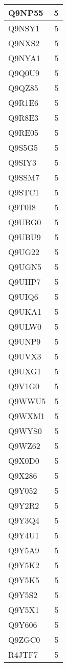 \documentclass[
]{book}
\theoremstyle{definition}
\theoremstyle{definition}
\theoremstyle{definition}
\theoremstyle{definition}
\theoremstyle{remark}
\begin{document}
\begin{table}
\begin{tabular}{l|r}
\hline
Q9NP55 & 5\\
\hline
Q9NSY1 & 5\\
\hline
Q9NXS2 & 5\\
\hline
Q9NYA1 & 5\\
\hline
Q9Q0U9 & 5\\
\hline
Q9QZ85 & 5\\
\hline
Q9R1E6 & 5\\
\hline
Q9R8E3 & 5\\
\hline
Q9RE05 & 5\\
\hline
Q9S5G5 & 5\\
\hline
Q9SIY3 & 5\\
\hline
Q9SSM7 & 5\\
\hline
Q9STC1 & 5\\
\hline
Q9T0I8 & 5\\
\hline
Q9UBG0 & 5\\
\hline
Q9UBU9 & 5\\
\hline
Q9UG22 & 5\\
\hline
Q9UGN5 & 5\\
\hline
Q9UHP7 & 5\\
\hline
Q9UIQ6 & 5\\
\hline
Q9UKA1 & 5\\
\hline
Q9ULW0 & 5\\
\hline
Q9UNP9 & 5\\
\hline
Q9UVX3 & 5\\
\hline
Q9UXG1 & 5\\
\hline
Q9V1G0 & 5\\
\hline
Q9WWU5 & 5\\
\hline
Q9WXM1 & 5\\
\hline
Q9WYS0 & 5\\
\hline
Q9WZ62 & 5\\
\hline
Q9X0D0 & 5\\
\hline
Q9X286 & 5\\
\hline
Q9Y052 & 5\\
\hline
Q9Y2R2 & 5\\
\hline
Q9Y3Q4 & 5\\
\hline
Q9Y4U1 & 5\\
\hline
Q9Y5A9 & 5\\
\hline
Q9Y5K2 & 5\\
\hline
Q9Y5K5 & 5\\
\hline
Q9Y5S2 & 5\\
\hline
Q9Y5X1 & 5\\
\hline
Q9Y606 & 5\\
\hline
Q9ZGC0 & 5\\
\hline
R4JTF7 & 5\\

\end{tabular}
\end{table}
\end{document}
